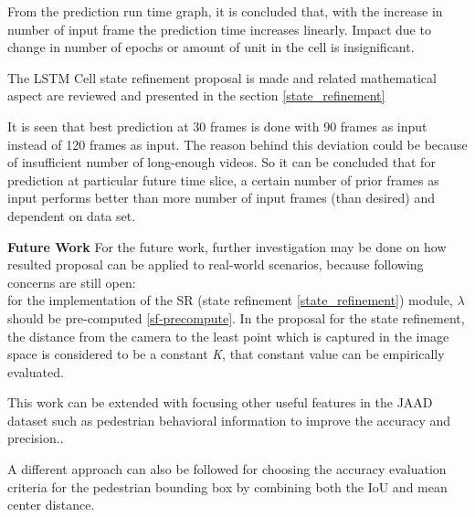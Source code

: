 From the prediction run time graph, it is concluded that, with the increase in number of input frame the prediction time increases linearly. Impact due to change in number of epochs or amount of unit in the cell is insignificant.

The LSTM Cell state refinement proposal is made and related mathematical aspect are reviewed and presented in the section \ref{state_refinement}

It is seen that best prediction at 30 frames is done with 90 frames as input instead of 120 frames as input. The reason behind this deviation could be because of insufficient number of long-enough videos. So it can be concluded that for prediction at particular future time slice, a certain number of prior frames as input performs better than more number of input frames (than desired) and dependent on data set.

\newpara

\textbf{Future Work}
For the future work, further investigation may be done on how resulted proposal can be applied to real-world scenarios, because following concerns are still open: \\
for the implementation of the SR (state refinement \ref{state_refinement}) module, $\lambda$ should be pre-computed \ref{sf-precompute}. In the proposal for the state refinement, the distance from the camera to the least point which is captured in the image space is considered to be a constant \textit{K}, that constant value can be empirically evaluated.

This work can be extended with focusing other useful features in the JAAD dataset such as pedestrian behavioral information to improve the accuracy and precision..

A different approach can also be followed for choosing the accuracy evaluation criteria for the pedestrian bounding box by combining both the IoU and mean center distance.
